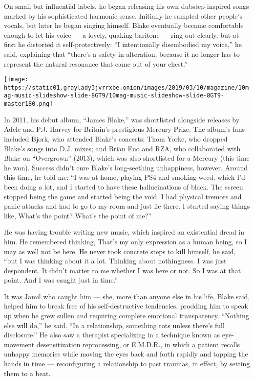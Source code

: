 On small but influential labels, he began releasing his own
dubstep-inspired songs marked by his sophisticated harmonic sense.
Initially he sampled other people's vocals, but later he began singing
himself. Blake eventually became comfortable enough to let his voice ---
a lovely, quaking baritone --- ring out clearly, but at first he
distorted it self-protectively: ``I intentionally disembodied my
voice,'' he said, explaining that ``there's a safety in alteration,
because it no longer has to represent the natural resonance that came
out of your chest.''

\texttt{[image: https://static01.graylady3jvrrxbe.onion/images/2019/03/10/magazine/10mag-music-slideshow-slide-8GT9/10mag-music-slideshow-slide-8GT9-master180.png]}

In 2011, his debut album, ``James Blake,'' was shortlisted alongside
releases by Adele and P.J. Harvey for Britain's prestigious Mercury
Prize. The album's fans included Bjork, who attended Blake's concerts;
Thom Yorke, who dropped Blake's songs into D.J. mixes; and Brian Eno and
RZA, who collaborated with Blake on ``Overgrown'' (2013), which was also
shortlisted for a Mercury (this time he won). Success didn't cure
Blake's long-seething unhappiness, however. Around this time, he told
me: ``I was at home, playing PS4 and smoking weed, which I'd been doing
a lot, and I started to have these hallucinations of black. The screen
stopped being the game and started being the void. I had physical
tremors and panic attacks and had to go to my room and just lie there. I
started saying things like, What's the point? What's the point of me?''

He was having trouble writing new music, which inspired an existential
dread in him. He remembered thinking, That's my only expression as a
human being, so I may as well not be here. He never took concrete steps
to kill himself, he said, ``but I was thinking about it a lot. Thinking
about nothingness. I was just despondent. It didn't matter to me whether
I was here or not. So I was at that point. And I was caught just in
time.''

It was Jamil who caught him --- she, more than anyone else in his life,
Blake said, helped him to break free of his self-destructive tendencies,
prodding him to speak up when he grew sullen and requiring complete
emotional transparency. ``Nothing else will do,'' he said. ``In a
relationship, something rots unless there's full disclosure.'' He also
saw a therapist specializing in a technique known as eye-movement
desensitization reprocessing, or E.M.D.R., in which a patient recalls
unhappy memories while moving the eyes back and forth rapidly and
tapping the hands in time --- reconfiguring a relationship to past
traumas, in effect, by setting them to a beat.

